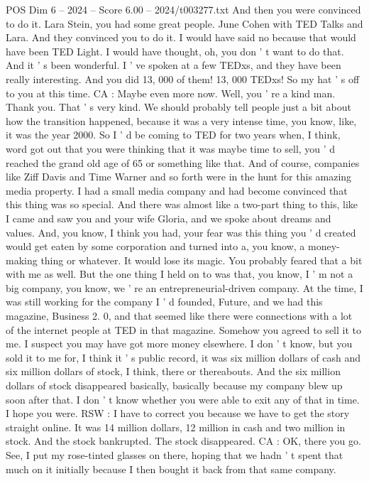 \begin{textsample}{POS Dim 6 – 2024 – Score 6.00 – 2024/t003277.txt}
And then you were convinced to do it.
Lara Stein, you had some great people.
June Cohen with TED Talks and Lara.
And they convinced you to do it.
I would have said no because that would have been TED Light.
I would have thought, oh, you don ' t want to do that.
And it ' s been wonderful.
I ' ve spoken at a few TEDxs, and they have been really interesting.
And you did 13, 000 of them! 13, 000 TEDxs!
So my hat ' s off to you at this time.
CA : Maybe even more now.
Well, you ' re a kind man.
Thank you.
That ' s very kind.
We should probably tell people just a bit about how the transition happened, because it was a very intense time, you know, like, it was the year 2000.
So I ' d be coming to TED for two years when, I think, word got out that you were thinking that it was maybe time to sell, you ' d reached the grand old age of 65 or something like that.
And of course, companies like Ziff Davis and Time Warner and so forth were in the hunt for this amazing media property.
I had a small media company and had become convinced that this thing was so special.
And there was almost like a two-part thing to this, like I came and saw you and your wife Gloria, and we spoke about dreams and values.
And, you know, I think you had, your fear was this thing you ' d created would get eaten by some corporation and turned into a, you know, a money-making thing or whatever.
It would lose its magic.
You probably feared that a bit with me as well.
But the one thing I held on to was that, you know, I ' m not a big company, you know, we ' re an entrepreneurial-driven company.
At the time, I was still working for the company I ' d founded, Future, and we had this magazine, Business 2. 0, and that seemed like there were connections with a lot of the internet people at TED in that magazine.
Somehow you agreed to sell it to me.
I suspect you may have got more money elsewhere.
I don ' t know, but you sold it to me for, I think it ' s public record, it was six million dollars of cash and six million dollars of stock, I think, there or thereabouts.
And the six million dollars of stock disappeared basically, basically because my company blew up soon after that.
I don ' t know whether you were able to exit any of that in time.
I hope you were.
RSW : I have to correct you because we have to get the story straight online.
It was 14 million dollars, 12 million in cash and two million in stock.
And the stock bankrupted.
The stock disappeared.
CA : OK, there you go.
See, I put my rose-tinted glasses on there, hoping that we hadn ' t spent that much on it initially because I then bought it back from that same company.

\end{textsample}

